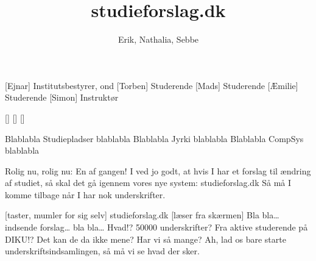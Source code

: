 \documentclass[a4paper,11pt]{article}
\title{studieforslag.dk}
\author{Erik, Nathalia, Sebbe}
\begin{document}
\maketitle

\begin{roles}
[Ejnar] Institutsbestyrer, ond
[Torben] Studerende
[Mads] Studerende
[Æmilie] Studerende
[Simon] Instruktør
\end{roles}

\begin{props}
[]
[]
[]
\end{props}


\begin{sketch}

 Blablabla Studiepladser blablabla
 Blablabla Jyrki blablabla
 Blablabla CompSys blablabla

 Rolig nu, rolig nu: En af gangen!
   I ved jo godt, at hvis I har et forslag til ændring af studiet,
   så skal det gå igennem vores nye system: studieforslag.dk
   Så må I komme tilbage når I har nok underskrifter.


[taster, mumler for sig selv] studieforslag.dk
[læser fra skærmen] Bla bla{\ldots} indsende forslag{\ldots} bla bla{\ldots} Hvad!? 50000 underskrifter?
 Fra aktive studerende på DIKU!?
 Det kan de da ikke mene?
 Har vi så mange?
 Ah, lad os bare starte underskriftsindsamlingen, så må vi se hvad der sker.


\end{sketch}
\end{document}
